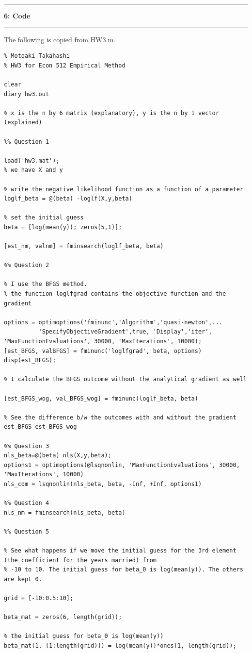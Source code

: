 \documentclass[11pt]{article}
\newcommand\question[2]{\vspace{.25in}\hrule\textbf{#1: #2}\vspace{.5em}\hrule\vspace{.10in}}
\begin{document}
\clearpage
\question{6}{Code}
The following is copied from HW3.m.
\begin{tiny}
\begin{verbatim}
% Motoaki Takahashi
% HW3 for Econ 512 Empirical Method

clear
diary hw3.out

% x is the n by 6 matrix (explanatory), y is the n by 1 vector (explained)

%% Question 1

load('hw3.mat');
% we have X and y

% write the negative likelihood function as a function of a parameter
loglf_beta = @(beta) -loglf(X,y,beta)

% set the initial guess
beta = [log(mean(y)); zeros(5,1)];

[est_nm, valnm] = fminsearch(loglf_beta, beta)

%% Question 2

% I use the BFGS method.
% the function loglfgrad contains the objective function and the gradient

options = optimoptions('fminunc','Algorithm','quasi-newton',...
          'SpecifyObjectiveGradient',true, 'Display','iter', 'MaxFunctionEvaluations', 30000, 'MaxIterations', 10000);
[est_BFGS, valBFGS] = fminunc('loglfgrad', beta, options)
disp(est_BFGS);

% I calculate the BFGS outcome without the analytical gradient as well

[est_BFGS_wog, val_BFGS_wog] = fminunc(loglf_beta, beta)

% See the difference b/w the outcomes with and without the gradient
est_BFGS-est_BFGS_wog

%% Question 3
nls_beta=@(beta) nls(X,y,beta);
options1 = optimoptions(@lsqnonlin, 'MaxFunctionEvaluations', 30000, 'MaxIterations', 10000)
nls_com = lsqnonlin(nls_beta, beta, -Inf, +Inf, options1)

%% Question 4
nls_nm = fminsearch(nls_beta, beta)

%% Question 5

% See what happens if we move the initial guess for the 3rd element (the coefficient for the years married) from
% -10 to 10. The initial guess for beta_0 is log(mean(y)). The others are kept 0.

grid = [-10:0.5:10];

beta_mat = zeros(6, length(grid));

% the initial guess for beta_0 is log(mean(y))
beta_mat(1, [1:length(grid)]) = log(mean(y))*ones(1, length(grid));


\end{verbatim}
\end{tiny}
\end{document}
